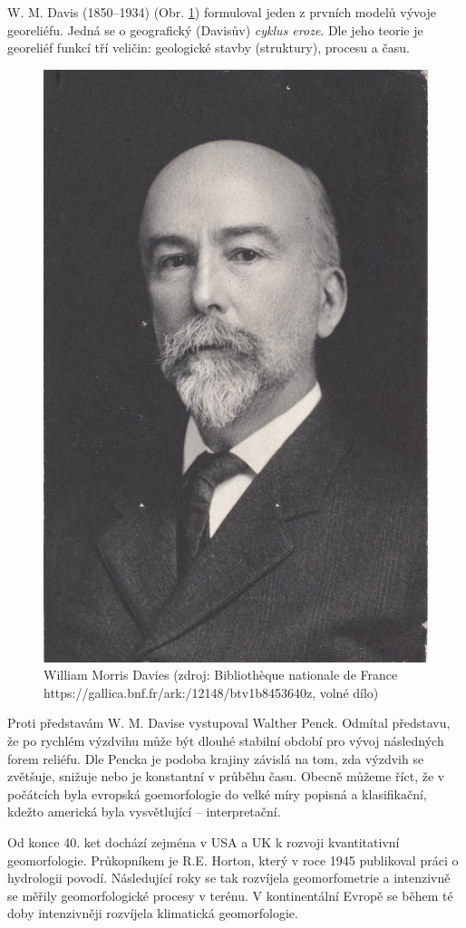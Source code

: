 W. M. Davis (1850--1934) (Obr. \ref{fig:davies}) formuloval jeden z prvních modelů vývoje georeliéfu. Jedná se o geografický (Davisův) \emph{cyklus eroze}. Dle jeho teorie je georeliéf funkcí tří veličin: geologické stavby (struktury), procesu a času. 
\begin{figure}[h]
	\centering
	\includegraphics[width=0.7\linewidth]{obrazky/uvod/davies}
	\caption{William Morris Davies (zdroj: Bibliothèque nationale de France https://gallica.bnf.fr/ark:/12148/btv1b8453640z, volné dílo)}
	\label{fig:davies}
\end{figure}

Proti představám W. M. Davise vystupoval Walther Penck. Odmítal představu, že po rychlém výzdvihu může být dlouhé stabilní období pro vývoj následných forem reliéfu. Dle Pencka je podoba krajiny závislá na tom, zda výzdvih se zvětšuje, snižuje nebo je konstantní v průběhu času.
Obecně můžeme říct, že v počátcích byla evropská goemorfologie do velké míry popisná a klasifikační, kdežto americká byla vysvětlující -- interpretační.

Od konce 40. ket dochází zejména v USA a UK k rozvoji kvantitativní geomorfologie. Průkopníkem je R.E. Horton, který v roce 1945 publikoval práci o hydrologii povodí. Následující roky se tak rozvíjela geomorfometrie a intenzivně se měřily geomorfologické procesy v terénu. V kontinentální Evropě se během té doby intenzivněji rozvíjela klimatická geomorfologie.

